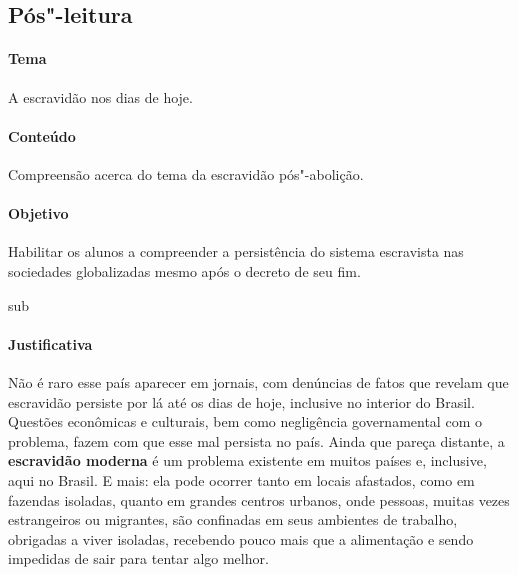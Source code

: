 \documentclass[11pt]{extarticle}
\begin{document}


\subsection{Pós"-leitura}

 \paragraph{Tema} A escravidão nos dias de hoje.

 \paragraph{Conteúdo} Compreensão acerca do tema da escravidão pós"-abolição.

 \paragraph{Objetivo} Habilitar os alunos a compreender a persistência 
 do sistema escravista nas sociedades globalizadas mesmo após o decreto
 de seu fim.

sub \paragraph{Justificativa} Não é raro esse país aparecer
em jornais, com denúncias de fatos que revelam que escravidão persiste
por lá até os dias de hoje, inclusive no interior do Brasil. 
Questões econômicas e culturais, bem como
negligência governamental com o problema, fazem com que esse mal
persista no país. Ainda que pareça distante, a \textbf{escravidão
moderna} é um problema existente em muitos países e, inclusive, aqui no
Brasil. E mais: ela pode ocorrer tanto em locais afastados, como em
fazendas isoladas, quanto em grandes centros urbanos, onde pessoas,
muitas vezes estrangeiros ou migrantes, são confinadas em seus ambientes
de trabalho, obrigadas a viver isoladas, recebendo pouco mais que a
alimentação e sendo impedidas de sair para tentar algo melhor.
\end{document}
